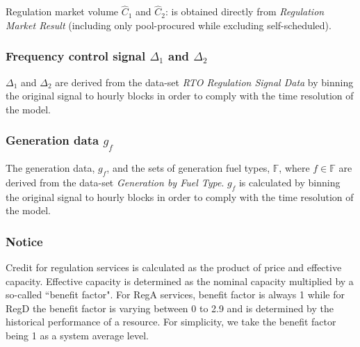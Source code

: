 Regulation market volume $\hat{C}_1$ and $\hat{C}_2$: is obtained directly from \textit{Regulation Market Result} (including only pool-procured while excluding self-scheduled).

\subsubsection{Frequency control signal $\Delta_1$ and $\Delta_2$}
$\Delta_1$ and $\Delta_2$ are derived from the data-set \textit{RTO Regulation Signal Data} by binning the original signal to hourly blocks in order to comply with the time resolution of the model.

\subsubsection{Generation data $g_{f}$}

The generation data, $g_{f}$, and the sets of generation fuel types, $\mathbb{F}$, where $f \in \mathbb{F}$ are derived from the data-set \textit{Generation by Fuel Type}.  $g_{f}$ is calculated by binning the original signal to hourly blocks in order to comply with the time resolution of the model.

\subsubsection{Notice}
Credit for regulation services is calculated as the product of price and effective capacity. Effective capacity is determined as the nominal capacity multiplied by a so-called ``benefit factor". For RegA services, benefit factor is always 1 while for RegD the benefit factor is varying between 0 to 2.9 and is determined by the historical performance of a resource. For simplicity, we take the benefit factor being 1 as a system average level.





